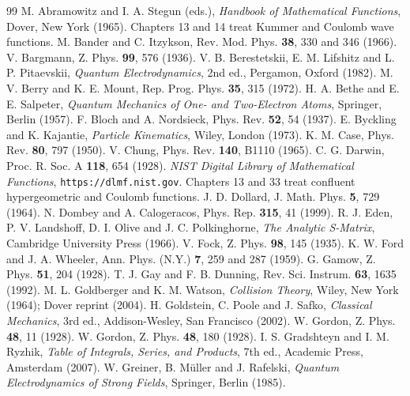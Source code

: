 \documentclass[11pt,a4paper]{book}
\numberwithin{equation}{chapter}
\begin{document}
\backmatter
\renewcommand{\bibname}{References}
\begin{thebibliography}{99}
 M. Abramowitz and I. A. Stegun (eds.), \emph{Handbook of Mathematical Functions}, Dover, New York (1965). Chapters 13 and 14 treat Kummer and Coulomb wave functions.
 M. Bander and C. Itzykson, Rev. Mod. Phys. \textbf{38}, 330 and 346 (1966).
 V. Bargmann, Z. Phys. \textbf{99}, 576 (1936).
 V. B. Berestetskii, E. M. Lifshitz and L. P. Pitaevskii, \emph{Quantum Electrodynamics}, 2nd ed., Pergamon, Oxford (1982).
 M. V. Berry and K. E. Mount, Rep. Prog. Phys. \textbf{35}, 315 (1972).
 H. A. Bethe and E. E. Salpeter, \emph{Quantum Mechanics of One- and Two-Electron Atoms}, Springer, Berlin (1957).
 F. Bloch and A. Nordsieck, Phys. Rev. \textbf{52}, 54 (1937).
 E. Byckling and K. Kajantie, \emph{Particle Kinematics}, Wiley, London (1973).
 K. M. Case, Phys. Rev. \textbf{80}, 797 (1950).
 V. Chung, Phys. Rev. \textbf{140}, B1110 (1965).
 C. G. Darwin, Proc. R. Soc. A \textbf{118}, 654 (1928).
 \emph{NIST Digital Library of Mathematical Functions}, \texttt{https://dlmf.nist.gov}. Chapters 13 and 33 treat confluent hypergeometric and Coulomb functions.
 J. D. Dollard, J. Math. Phys. \textbf{5}, 729 (1964).
 N. Dombey and A. Calogeracos, Phys. Rep. \textbf{315}, 41 (1999).
 R. J. Eden, P. V. Landshoff, D. I. Olive and J. C. Polkinghorne, \emph{The Analytic S-Matrix}, Cambridge University Press (1966).
 V. Fock, Z. Phys. \textbf{98}, 145 (1935).
 K. W. Ford and J. A. Wheeler, Ann. Phys. (N.Y.) \textbf{7}, 259 and 287 (1959).
 G. Gamow, Z. Phys. \textbf{51}, 204 (1928).
 T. J. Gay and F. B. Dunning, Rev. Sci. Instrum. \textbf{63}, 1635 (1992).
 M. L. Goldberger and K. M. Watson, \emph{Collision Theory}, Wiley, New York (1964); Dover reprint (2004).
 H. Goldstein, C. Poole and J. Safko, \emph{Classical Mechanics}, 3rd ed., Addison-Wesley, San Francisco (2002).
 W. Gordon, Z. Phys. \textbf{48}, 11 (1928).
 W. Gordon, Z. Phys. \textbf{48}, 180 (1928).
 I. S. Gradshteyn and I. M. Ryzhik, \emph{Table of Integrals, Series, and Products}, 7th ed., Academic Press, Amsterdam (2007).
 W. Greiner, B. M\"uller and J. Rafelski, \emph{Quantum Electrodynamics of Strong Fields}, Springer, Berlin (1985).

\end{thebibliography}
\end{document}
